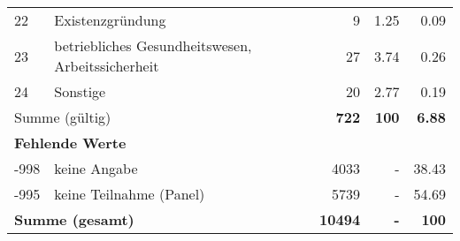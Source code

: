 \begin{longtable}{lXrrr}
        22 & \multicolumn{1}{X}{Existenzgründung} & %
          \num{9} &
          \num[round-mode=places,round-precision=2]{1,25} &
          \num[round-mode=places,round-precision=2]{0,09} \\

        23 & \multicolumn{1}{X}{betriebliches Gesundheitswesen, Arbeitssicherheit} & %
          \num{27} &
          \num[round-mode=places,round-precision=2]{3,74} &
          \num[round-mode=places,round-precision=2]{0,26} \\

        24 & \multicolumn{1}{X}{Sonstige} & %
          \num{20} &
          \num[round-mode=places,round-precision=2]{2,77} &
          \num[round-mode=places,round-precision=2]{0,19} \\

     \midrule
     \multicolumn{2}{l}{Summe (gültig)} &
       \textbf{\num{722}} &
     \textbf{100} &
       \textbf{\num[round-mode=places,round-precision=2]{6,88}} \\
     \multicolumn{5}{l}{\textbf{Fehlende Werte}}\\
       -998 &
       keine Angabe &
         \num{4033} &
        - &
         \num[round-mode=places,round-precision=2]{38,43} \\
       -995 &
       keine Teilnahme (Panel) &
         \num{5739} &
        - &
         \num[round-mode=places,round-precision=2]{54,69} \\
     \midrule
     \multicolumn{2}{l}{\textbf{Summe (gesamt)}} &
          \textbf{\num{10494}} &
        \textbf{-} &
        \textbf{100} \\
     \bottomrule
     \end{longtable}
     
